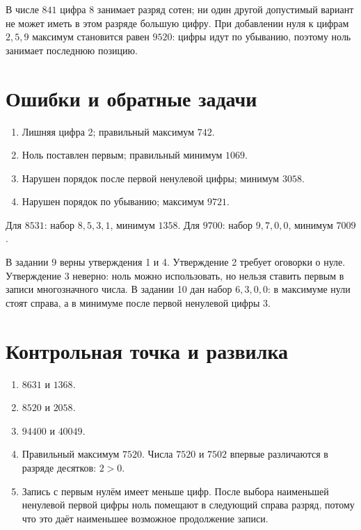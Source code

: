 \begin{teacherbox}[Задание 6]
  В числе \(841\) цифра 8 занимает разряд сотен; ни один другой допустимый
  вариант не может иметь в этом разряде большую цифру. При добавлении нуля к
  цифрам \(2,5,9\) максимум становится равен \(9520\): цифры идут по убыванию,
  поэтому ноль занимает последнюю позицию.
\end{teacherbox}

\section{Ошибки и обратные задачи}

\begin{teacherbox}[Задание 7]
  \begin{enumerate}
    \item Лишняя цифра 2; правильный максимум \(742\).
    \item Ноль поставлен первым; правильный минимум \(1069\).
    \item Нарушен порядок после первой ненулевой цифры; минимум \(3058\).
    \item Нарушен порядок по убыванию; максимум \(9721\).
  \end{enumerate}
\end{teacherbox}

\begin{teacherbox}[Задания 8 и 9]
  Для \(8531\): набор \(8,5,3,1\), минимум \(1358\). Для \(9700\): набор
  \(9,7,0,0\), минимум \(7009\).

  В задании 9 верны утверждения 1 и 4. Утверждение 2 требует оговорки о нуле.
  Утверждение 3 неверно: ноль можно использовать, но нельзя ставить первым в
  записи многозначного числа. В задании 10 дан набор \(6,3,0,0\): в максимуме
  нули стоят справа, а в минимуме \textemdash{} после первой ненулевой цифры 3.
\end{teacherbox}

\newpage
\section{Контрольная точка и развилка}

\begin{teacherbox}[Ответы]
  \begin{enumerate}
    \item \(8631\) и \(1368\).
    \item \(8520\) и \(2058\).
    \item \(94400\) и \(40049\).
    \item Правильный максимум \(7520\). Числа \(7520\) и \(7502\) впервые
      различаются в разряде десятков: \(2>0\).
    \item Запись с первым нулём имеет меньше цифр. После выбора наименьшей
      ненулевой первой цифры ноль помещают в следующий справа разряд, потому
      что это даёт наименьшее возможное продолжение записи.
  \end{enumerate}
\end{teacherbox}

